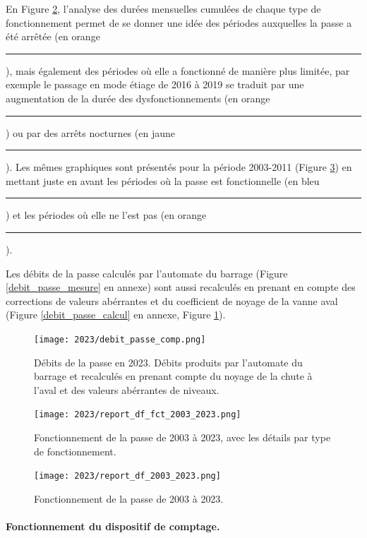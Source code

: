 \documentclass[11pt,twocolumn,titlepage,twoside]{article}\usepackage[]{graphicx}\usepackage[]{color}
\begin{document}
En Figure \ref{report_df_fct_2003_2023}, l'analyse des durées mensuelles
cumulées de chaque type de fonctionnement permet de se donner une idée des
périodes auxquelles la passe a été arrêtée (en orange
\textcolor{orange_EV}{\rule[-0.2mm]{3mm}{2mm}}), mais également des périodes où elle a fonctionné de manière plus limitée, 
par exemple le passage en mode étiage de 2016 à 2019 se traduit par une  
augmentation de la durée des dysfonctionnements
(en orange \textcolor{orange_EV}{\rule[-0.2mm]{3mm}{2mm}}) ou par des arrêts
nocturnes (en jaune \textcolor{jaune_EV}{\rule[-0.2mm]{3mm}{2mm}}). Les mêmes
graphiques sont présentés pour la période 2003-2011 (Figure
\ref{report_df_2003_2023}) en mettant juste en avant les périodes où la passe est fonctionnelle
(en bleu \textcolor{bleu_EV}{\rule[-0.2mm]{3mm}{2mm}}) et les périodes où elle
ne l'est pas (en orange \textcolor{orange_EV}{\rule[-0.2mm]{3mm}{2mm}}).

Les débits de la passe calculés par l'automate du barrage 
(Figure \ref{debit_passe_mesure} en annexe) sont aussi recalculés en prenant en
compte des corrections de valeurs abérrantes et du coefficient de noyage de la vanne aval
(Figure \ref{debit_passe_calcul} en annexe, Figure \ref{debit_passe_comp}).

\begin{figure}[htpb]
\centering
\texttt{[image: 2023/debit\_passe\_comp.png]}
\caption{Débits de la passe en 2023. Débits produits par l'automate du
barrage et recalculés en prenant compte du noyage de la chute à l'aval et des
valeurs abérrantes de niveaux.}
\label{debit_passe_comp}
\end{figure}

%
\begin{figure}[htpb]
\centering
\texttt{[image: 2023/report\_df\_fct\_2003\_2023.png]}
\caption{Fonctionnement de la passe de 2003 à 2023, avec les détails par type
de fonctionnement.}
\label{report_df_fct_2003_2023}
\end{figure}%
%

%
\begin{figure}[htpb]
\centering
\texttt{[image: 2023/report\_df\_2003\_2023.png]}
\caption{Fonctionnement de la passe de 2003 à 2023.}
\label{report_df_2003_2023}
\end{figure}%
%

\paragraph{Fonctionnement du dispositif de comptage.}
\end{document}
